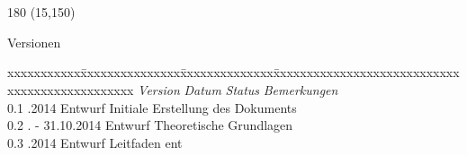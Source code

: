 
\chapter*{}
\label{chap:versionen}

\begin{textblock}{180} (15,150)
\color{black}
\begin{huge}
Versionen
\end{huge}
\vspace{10mm}

\fontsize{10pt}{18pt}\selectfont
\begin{tabbing}
xxxxxxxxxxx\=xxxxxxxxxxxxxxx\=xxxxxxxxxxxxxx\=xxxxxxxxxxxxxxxxxxxxxxxxxxxxxxxxxxxxxxxxxxxxxxx \kill
\textit{Version}	\> \textit{Datum}	\> \textit{Status}		\> \textit{Bemerkungen}\\
0.1	.2014	\> Entwurf		\> Initiale Erstellung des Dokuments\\
0.2	. - 31.10.2014	\> Entwurf		\> Theoretische Grundlagen\\
0.3	.2014	\> Entwurf		\> Leitfaden ent\\
\end{tabbing}

\end{textblock}
